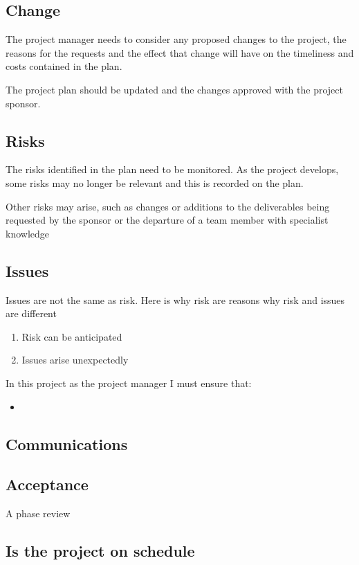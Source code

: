\documentclass{article}
\begin{document}
\subsection{Change}

The project manager needs to consider any proposed changes to the project, the reasons for the requests and the effect that change will have on the timeliness and costs contained in the plan.

The project plan should be updated and the changes approved with the project sponsor.

\subsection{Risks}

The risks identified in the plan need to be monitored. As the project develops, some risks may no longer be relevant and this is recorded on the plan. 

Other risks may arise, such as changes or additions to the deliverables being requested by the sponsor or the departure of a team member with specialist knowledge

\subsection{Issues}
Issues are not the same as risk. Here is why risk are reasons why risk and issues are different
\begin{enumerate}
	\item Risk can be anticipated
	\item Issues arise unexpectedly
\end{enumerate}

In this project as the project manager I must ensure that:
\begin{itemize}
	\item
\end{itemize}

\subsection{Communications}

\subsection{Acceptance}

A phase review
		\subsection{Is the project on schedule}
\end{document}
